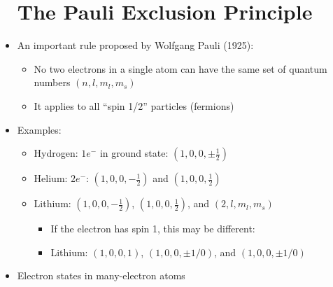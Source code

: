 \begin{itemize}

    \section{The Pauli Exclusion Principle}

  \item An important rule proposed by Wolfgang Pauli (1925):

    \begin{itemize}

      \item No two electrons in a single atom can have the same set of quantum numbers $(n,l,m_l,m_s)$

      \item It applies to all ``spin 1/2'' particles (fermions)

    \end{itemize}

  \item Examples:

    \begin{itemize}

      \item Hydrogen: $1e^-$ in ground state: $\left(1,0,0,\pm\frac{1}{2}\right)$

      \item Helium: $2e^-$: $\left(1,0,0,-\frac{1}{2}\right)$ and $\left(1,0,0,\frac{1}{2}\right)$

      \item Lithium: $\left(1,0,0,-\frac{1}{2}\right)$, $\left(1,0,0,\frac{1}{2}\right)$, and $\left( 2,l,m_l,m_s \right)$

        \begin{itemize}

          \item If the electron has spin 1, this may be different:

          \item Lithium: $\left(1,0,0,1\right)$, $\left(1,0,0,\pm1/0\right)$, and $\left( 1,0,0,\pm1/0 \right)$

        \end{itemize}

    \end{itemize}

  \item Electron states in many-electron atoms

    \begin{itemize}


\end{itemize}
\end{itemize}
